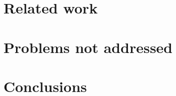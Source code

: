 \documentclass[11pt,a4paper]{article}
\begin{document}
\section{Related work}
\label{sec:related-work}

\section{Problems not addressed}
\label{sec:probl-not-addr}






\section{Conclusions}
\label{sec:conclusions}



\end{document}
